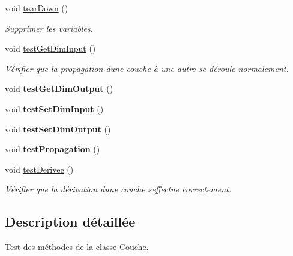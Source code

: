 \begin{DoxyCompactItemize}
void \hyperlink{class_test_couche_a52d776a6624d1ff323b9c390be482809}{tear\+Down} ()
\begin{DoxyCompactList}\small\item\em Supprimer les variables. \end{DoxyCompactList}\item 
\mbox{\label{class_test_couche_a91abe7adddd8687482a86316995d6d2b}} 
void \hyperlink{class_test_couche_a91abe7adddd8687482a86316995d6d2b}{test\+Get\+Dim\+Input} ()
\begin{DoxyCompactList}\small\item\em Vérifier que la propagation d\textquotesingle{}une couche à une autre se déroule normalement. \end{DoxyCompactList}\item 
\mbox{\label{class_test_couche_a9f2a6f3c97c55c920acb3d552a5ccc4d}} 
void {\bfseries test\+Get\+Dim\+Output} ()
\item 
\mbox{\label{class_test_couche_aa192e04275717fab674f977fb24cb59e}} 
void {\bfseries test\+Set\+Dim\+Input} ()
\item 
\mbox{\label{class_test_couche_a6762ad4ef2194ba9990f838d0543c851}} 
void {\bfseries test\+Set\+Dim\+Output} ()
\item 
\mbox{\label{class_test_couche_a2012666426b127d26006dca756986575}} 
void {\bfseries test\+Propagation} ()
\item 
\mbox{\label{class_test_couche_aefdfb41451d5a04fcc3e33704b900315}} 
void \hyperlink{class_test_couche_aefdfb41451d5a04fcc3e33704b900315}{test\+Derivee} ()
\begin{DoxyCompactList}\small\item\em Vérifier que la dérivation d\textquotesingle{}une couche s\textquotesingle{}effectue correctement. \end{DoxyCompactList}\end{DoxyCompactItemize}


\subsection{Description détaillée}
Test des méthodes de la classe \hyperlink{class_couche}{Couche}. 

